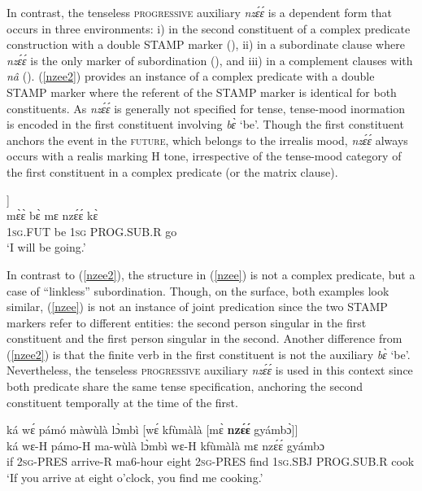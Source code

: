 In contrast, the tenseless \textsc{progressive} auxiliary {\itshape nzɛ́ɛ́} is a dependent form that occurs in three environments: i) in the second constituent of a complex predicate construction with a double STAMP marker (), ii) in a subordinate clause where {\itshape nzɛ́ɛ́} is the only marker of subordination (), and iii) in a complement clauses with {\itshape nâ} ().  (\ref{nzee2}) provides an instance of a complex predicate with a double STAMP marker where the referent of the STAMP marker is identical for both constituents. As {\itshape nzɛ́ɛ́} is generally not specified for tense, tense-mood inormation is encoded in the first constituent involving {\itshape bɛ̀} `be'. Though the first constituent anchors the event in the \textsc{future}, which belongs to the irrealis mood, {\itshape nzɛ́ɛ́} always occurs with a realis marking H tone, irrespective of the tense-mood category of the first constituent in a complex predicate (or the matrix clause).

\begin{exe} 
\ex\label{nzee2}
  \glll  [mɛ̀ɛ̀ bɛ̀ [mɛ̀ {\bfseries nzɛ́ɛ́} kɛ̀]] \\
         mɛ̀ɛ̀ bɛ̀ mɛ nzɛ́ɛ́ kɛ̀ \\
            1\textsc{sg}.FUT be 1\textsc{sg} PROG.SUB.R go \\
    \trans `I will be going.'
\end{exe}

In contrast to (\ref{nzee2}), the structure in (\ref{nzee}) is not a complex predicate, but a case of ``linkless'' subordination. Though, on the surface, both examples look similar, (\ref{nzee}) is not an instance of joint predication since the two STAMP markers refer to different entities: the second person singular in the first  constituent and the first person singular in the second. Another difference from (\ref{nzee2}) is that the finite verb in the first constituent is not the auxiliary {\itshape bɛ̀} `be'. Nevertheless, the tenseless \textsc{progressive} auxiliary {\itshape nzɛ́ɛ́} is used in this context since both predicate share the same tense specification, anchoring the second constituent temporally at the time of the first.

\begin{exe} 
\ex\label{nzee}
  \glll  ká wɛ́ pámó màwùlà lɔ̀mbì [wɛ́ kfùmàlà [mɛ̀ {\bfseries nzɛ́ɛ́} gyámbɔ̀]] \\
         ká wɛ-H pámo-H ma-wùlà lɔ̀mbì wɛ-H kfùmàlà mɛ nzɛ́ɛ́ gyámbɔ \\
           if 2\textsc{sg}-PRES arrive-R ma6-hour eight 2\textsc{sg}-PRES find 1\textsc{sg}.SBJ PROG.SUB.R cook \\
    \trans `If you arrive at eight o'clock, you find me cooking.'
\end{exe}

